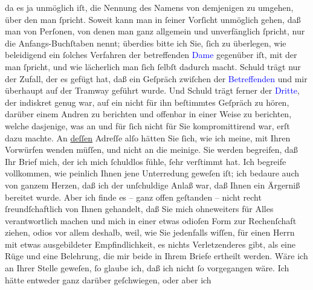                da es ja unmöglich iſt, die Nennung des Namens von demjenigen zu umgehen, über den
               man ſpricht. Soweit kann man in ſeiner Vorſicht unmöglich gehen, daß man von
               Perſonen, von denen man ganz {\pb}allgemein und unverfänglich ſpricht, nur die Anfangs-Buchſtaben nennt; überdies
               bitte ich Sie, ſich zu überlegen, wie beleidigend ein ſolches Verfahren der
               betreffenden \textcolor{blue}{Dame}{} gegenüber
               iſt, mit der man ſpricht, und wie lächerlich man ſich ſelbſt dadurch macht. Schuld
               trägt nur der Zufall, der es gefügt hat, daß ein Geſpräch zwiſchen der \textcolor{blue}{Betreffenden}{} und mir
               überhaupt auf der Tramway geführt wurde. Und Schuld trägt ferner der \textcolor{blue}{Dritte}{}, der indiskret genug
               war, auf ein nicht für ihn beſtimmtes Geſpräch zu hören, darüber einem Andren zu
               berichten und offenbar in einer Weise zu berichten, welche dasjenige, was an  und für ſich nicht \introOben{}für Sie\introOben{}
               kompromittirend war, erſt dazu machte. An \uline{deſſen}
               Adreſſe alſo hätten Sie ſich, wie ich meine, mit Ihren Vorwürfen wenden müſſen, und
               nicht an die meinige.\pend
           \pstart
           Sie werden begreifen, daß Ihr Brief mich, der ich mich ſchuldlos fühle, ſehr
               verſtimmt hat. Ich begreife vollkommen, wie peinlich Ihnen jene Unterredung geweſen
               iſt; ich bedaure auch von ganzem Herzen, daß ich der unſchuldige Anlaß war, daß Ihnen
               ein Ärgerniß bereitet wurde. Aber ich finde es – ganz offen geſtanden – {\pb}nicht recht ſreundſchaftlich von
               Ihnen gehandelt, daß Sie mich ohneweiters für Alles verantwortlich machen und mich in
               einer etwas odioſen Form zur Rechenſchaft ziehen, odios vor allem deshalb, weil, wie
               Sie jedenfalls wiſſen, für einen Herrn mit etwas ausgebildeter Empfindlichkeit, es
               nichts Verletzenderes gibt, als eine Rüge und eine Belehrung, die mir beide in Ihrem
               Briefe ertheilt werden. Wäre ich an Ihrer Stelle geweſen, ſo glaube ich, daß ich
               nicht ſo vorgegangen wäre. Ich hätte entweder ganz darüber geſchwiegen, oder aber ich
